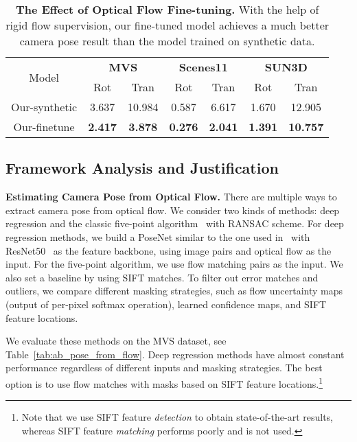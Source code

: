 \documentclass[final]{cvpr}
\begin{document}
\begin{table}[ht]
\small
\tabcolsep=0.13cm
\centering
\caption{\small{\textbf{The Effect of Optical Flow Fine-tuning.} With the help of rigid flow supervision, our fine-tuned model achieves a much better camera pose result than the model trained on synthetic data. }}
\begin{tabular}{c|c|c|c|c|c|c}
\hline
\multirow{2}{*}{Model} & \multicolumn{2}{c|}{\textbf{MVS}} & \multicolumn{2}{c|}{\textbf{Scenes11}} & \multicolumn{2}{c}{\textbf{SUN3D}} \\ \cline{2-7} 
                  &   Rot        &   Tran        &   Rot        &   Tran        &   Rot        &   Tran        \\ \hline
Our-synthetic      & 3.637 & 10.984      &  0.587&6.617        &    1.670 &12.905          \\ \hline
Our-finetune              &\textbf{2.417}&\textbf{3.878}        &    \textbf{0.276}&\textbf{2.041}          &    \textbf{1.391} &\textbf{10.757}       
\\ \hline
\end{tabular}
\label{tab:refine-pose}
\vspace{-0mm}
\end{table}

\subsection{Framework Analysis and Justification}
\label{sec:ablaiton}
\textbf{Estimating Camera Pose from Optical Flow.}
There are multiple ways to extract camera pose from optical flow. We consider two kinds of methods: deep regression and the classic five-point algorithm~\cite{li2006five} with RANSAC scheme. For deep regression methods, we build a PoseNet similar to the one used in~\cite{flowmotion} with ResNet50~\cite{resnet} as the feature backbone, using image pairs and optical flow as the input. For the five-point algorithm, we use flow matching pairs as the input. We also set a baseline by using SIFT matches. To filter out error matches and outliers, we compare different masking strategies, such as flow uncertainty maps (output of per-pixel softmax operation), learned confidence maps, and SIFT feature locations.

We evaluate these methods on the MVS dataset, see Table~\ref{tab:ab_pose_from_flow}. Deep regression methods have almost constant performance regardless of different inputs and masking strategies. The best option is to use flow matches with masks based on SIFT feature locations.\footnote{Note that we use SIFT feature \emph{detection} to obtain state-of-the-art results, whereas SIFT feature \emph{matching} performs poorly and is not used.}
\end{document}
